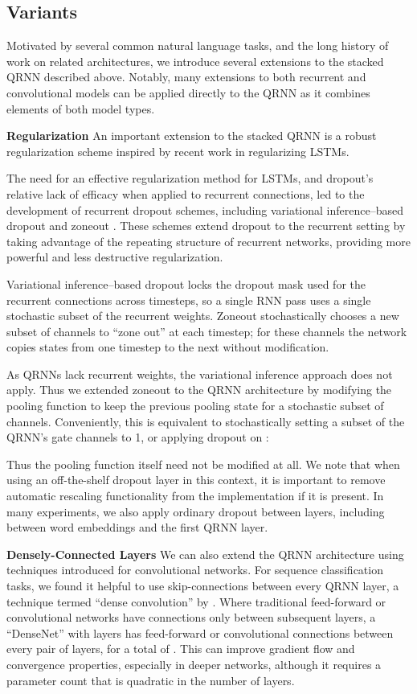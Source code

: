 \documentclass{article} \usepackage{iclr2017_conference,times}
\begin{document}
\subsection{Variants}

Motivated by several common natural language tasks, and the long history of work on related architectures, we introduce several extensions to the stacked QRNN described above. Notably, many extensions to both recurrent and convolutional models can be applied directly to the QRNN as it combines elements of both model types.

\textbf{Regularization} \label{sec:qrnn_reg}
An important extension to the stacked QRNN is a robust regularization scheme inspired by recent work in regularizing LSTMs.

The need for an effective regularization method for LSTMs, and dropout's relative lack of efficacy when applied to recurrent connections, led to the development of recurrent dropout schemes, including variational inference--based dropout \citep{Gal2015} and zoneout \citep{Krueger2016}. These schemes extend dropout to the recurrent setting by taking advantage of the repeating structure of recurrent networks, providing more powerful and less destructive regularization.

Variational inference--based dropout locks the dropout mask used for the recurrent connections across timesteps, so a single RNN pass uses a single stochastic subset of the recurrent weights.
Zoneout stochastically chooses a new subset of channels to ``zone out'' at each timestep; for these channels the network copies states from one timestep to the next without modification.

As QRNNs lack recurrent weights, the variational inference approach does not apply.  Thus we extended zoneout to the QRNN architecture by modifying the pooling function to keep the previous pooling state for a stochastic subset of channels. Conveniently, this is equivalent to stochastically setting a subset of the QRNN's  gate channels to 1, or applying dropout on :

Thus the pooling function itself need not be modified at all. We note that when using an off-the-shelf dropout layer in this context, it is important to remove automatic rescaling functionality from the implementation if it is present.
In many experiments, we also apply ordinary dropout between layers, including between word embeddings and the first QRNN layer.

\textbf{Densely-Connected Layers}
We can also extend the QRNN architecture using techniques introduced for convolutional networks. For sequence classification tasks, we found it helpful to use skip-connections between every QRNN layer, a technique termed ``dense convolution'' by \cite{Huang2016}. Where traditional feed-forward or convolutional networks have connections only between subsequent layers, a ``DenseNet'' with  layers has feed-forward or convolutional connections between every pair of layers, for a total of . This can improve gradient flow and convergence properties, especially in deeper networks, although it requires a parameter count that is quadratic in the number of layers.
\end{document}
